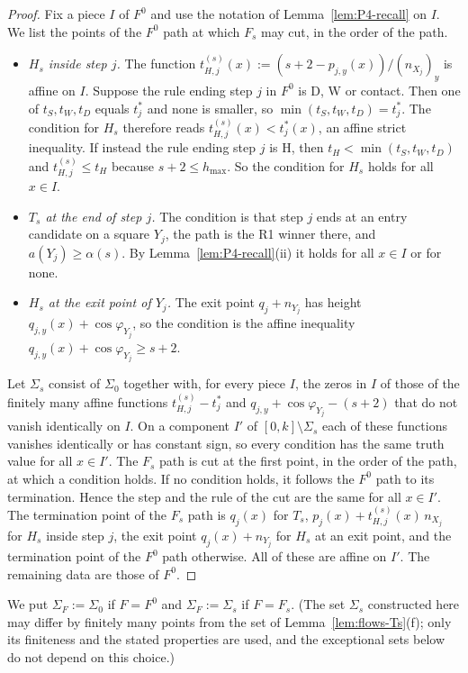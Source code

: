 \documentclass[11pt]{amsart}
\newcommand{\hmax}{h_{\max}}
\newcommand{\Fz}{F^{0}}
\newcommand{\Fs}{F_{s}}
\theoremstyle{definition}
\theoremstyle{remark}
\numberwithin{equation}{section}
\begin{document}
\begin{proof}
Fix a piece $I$ of $\Fz$ and use the notation of Lemma~\ref{lem:P4-recall} on $I$. We list the points of the $\Fz$ path at which $\Fs$ may cut, in the order of the path.
\begin{itemize}
\item \emph{$H_s$ inside step $j$.} The function $t^{(s)}_{H,j}(x):=(s+2-p_{j,y}(x))/(n_{X_j})_y$ is affine on $I$. Suppose the rule ending step $j$ in $\Fz$ is D, W or contact. Then one of $t_S,t_W,t_D$ equals $t^*_j$ and none is smaller, so $\min(t_S,t_W,t_D)=t^*_j$. The condition for $H_s$ therefore reads $t^{(s)}_{H,j}(x)<t^*_j(x)$, an affine strict inequality. If instead the rule ending step $j$ is H, then $t_H<\min(t_S,t_W,t_D)$ and $t^{(s)}_{H,j}\le t_H$ because $s+2\le\hmax$. So the condition for $H_s$ holds for all $x\in I$.
\item \emph{$T_s$ at the end of step $j$.} The condition is that step $j$ ends at an entry candidate on a square $Y_j$, the path is the R1 winner there, and $a(Y_j)\ge\alpha(s)$. By Lemma~\ref{lem:P4-recall}(ii) it holds for all $x\in I$ or for none.
\item \emph{$H_s$ at the exit point of $Y_j$.} The exit point $q_j+n_{Y_j}$ has height $q_{j,y}(x)+\cos\varphi_{Y_j}$, so the condition is the affine inequality $q_{j,y}(x)+\cos\varphi_{Y_j}\ge s+2$.
\end{itemize}
Let $\Sigma_s$ consist of $\Sigma_0$ together with, for every piece $I$, the zeros in $I$ of those of the finitely many affine functions $t^{(s)}_{H,j}-t^*_j$ and $q_{j,y}+\cos\varphi_{Y_j}-(s+2)$ that do not vanish identically on $I$. On a component $I'$ of $[0,k]\setminus\Sigma_s$ each of these functions vanishes identically or has constant sign, so every condition has the same truth value for all $x\in I'$. The $\Fs$ path is cut at the first point, in the order of the path, at which a condition holds. If no condition holds, it follows the $\Fz$ path to its termination. Hence the step and the rule of the cut are the same for all $x\in I'$. The termination point of the $\Fs$ path is $q_j(x)$ for $T_s$, $p_j(x)+t^{(s)}_{H,j}(x)\,n_{X_j}$ for $H_s$ inside step $j$, the exit point $q_j(x)+n_{Y_j}$ for $H_s$ at an exit point, and the termination point of the $\Fz$ path otherwise. All of these are affine on $I'$. The remaining data are those of $\Fz$.
\end{proof}

We put $\Sigma_F:=\Sigma_0$ if $F=\Fz$ and $\Sigma_F:=\Sigma_s$ if $F=\Fs$. (The set $\Sigma_s$ constructed here may differ by finitely many points from the set of Lemma~\ref{lem:flows-Ts}(f); only its finiteness and the stated properties are used, and the exceptional sets below do not depend on this choice.)
\end{document}
